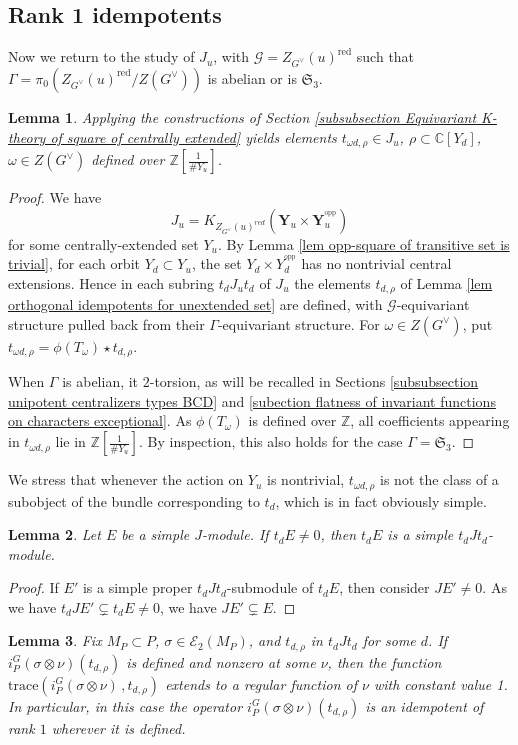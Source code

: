 \documentclass[10pt]{article}
\newcommand{\opp}{^\mathrm{opp}}
\newcommand{\trace}[2]{\mathrm{trace}\left({#1}\,,{#2}\right)}
\newcommand{\Z}{\mathbb{Z}}
\newcommand{\C}{\mathbb{C}}
\newcommand{\Sn}{\mathfrak{S}}
\newtheorem{lem}{Lemma}
\theoremstyle{definition}
\theoremstyle{remark}
\newcommand{\Gd}{G^\vee}
\newcommand{\Zur}{Z_{G^\vee}(u)^{\mathrm{red}}}
\newcommand{\Zz}{\mathcal{G}}
\newcommand{\Y}{\mathbf{Y}}
\begin{document}
\subsection{Rank 1 idempotents}
\label{subsection rank 1 idempotents}
%
Now we return to the study of $J_u$, with $\Zz=\Zur$ such that $\Gamma=\pi_0(\Zur/Z(\Gd))$ is abelian or is $\Sn_3$.
%
\begin{lem}
\label{cor classical idempotents are integral}
Applying the constructions of Section \ref{subsubsection Equivariant K-theory 
of square of centrally extended} yields elements 
$t_{\omega d,\rho}\in J_u$, $\rho\subset\C[Y_d]$, $\omega\in Z(G^\vee)$ defined over 
$\Z\left[\frac{1}{\# Y_u}\right]$. 
\end{lem}
%
\begin{proof}
We have 
%
\[
J_u=K_{Z_{G^\vee}(u)^{red}}\left(\Y_u\times \Y^{\opp}_u\right)
\]
%
for some centrally-extended set $Y_u$. By Lemma \ref{lem opp-square of transitive set is trivial}, 
for each orbit $Y_d\subset Y_u$, the set $Y_d\times Y_d^{\opp}$ has no nontrivial central extensions. 
Hence in each subring $t_dJ_ut_d$ of $J_u$ the elements $t_{d,\rho}$ of Lemma \ref{lem orthogonal idempotents for unextended set} are defined, with $\Zz$-equivariant structure pulled back from their 
$\Gamma$-equivariant
structure. For $\omega\in Z(\Gd)$, put $t_{\omega d,\rho}=\phi(T_\omega)\star t_{d,\rho}$.

When $\Gamma$ is abelian, it $2$-torsion, as will be recalled in Sections 
\ref{subsubsection unipotent centralizers types BCD} and 
\ref{subection flatness of invariant functions on characters exceptional}. 
As $\phi(T_\omega)$ is defined over $\Z$, all coefficients appearing in $t_{\omega d,\rho}$ lie in 
$\Z\left[\frac{1}{\# Y_u}\right]$.
By inspection, this also holds for the case $\Gamma=\Sn_3$.
\end{proof}
%
We stress that whenever the action on $Y_u$ is nontrivial, $t_{\omega d,\rho}$ is not the class of 
a subobject of the bundle corresponding to $t_d$, which is in fact obviously simple.
%
\begin{lem}
\label{lem projection of simple is simple}
Let $E$ be a simple $J$-module. If $t_dE\neq 0$, then $t_dE$ is a simple $t_dJt_d$-module.
\end{lem}
%
\begin{proof}
If $E'$ is a simple proper $t_d Jt_d$-submodule of $t_dE$, then consider $JE'\neq 0$. As we have
$t_dJE'\subsetneq t_dE\neq 0$, we have $JE'\subsetneq E$.
\end{proof}
%
\begin{lem}
\label{lem pi(trho) has rank at most 1}
Fix $M_P\subset P$, $\sigma\in\mathcal{E}_2(M_P)$, and  $t_{d,\rho}$ in $t_dJt_d$ for some $d$.
If $i_P^G(\sigma\otimes\nu)(t_{d,\rho})$ is defined and nonzero at some
$\nu$, then the function 
$\trace{i_P^G(\sigma\otimes\nu)}{t_{d,\rho}}$ extends to a regular function of
$\nu$ with constant value 1. In particular, in this case the 
operator $i_P^G(\sigma\otimes\nu)(t_{d,\rho})$ is an idempotent of rank
$1$ wherever it is defined.
\end{lem}
\end{document}

